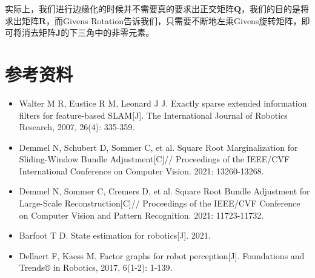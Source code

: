 \documentclass[a4pape,oneside,10pt]{article}
\begin{document}
实际上，我们进行边缘化的时候并不需要真的要求出正交矩阵$\mathbf{Q}$，我们的目的是将求出矩阵$\mathbf{R}$，而Givens Rotation告诉我们，只需要不断地左乘Givens旋转矩阵，即可将消去矩阵$\mathbf{J}$的下三角中的非零元素。

\section{参考资料}
\begin{itemize}
    \item Walter M R, Eustice R M, Leonard J J. Exactly sparse extended information filters for feature-based SLAM[J].
     The International Journal of Robotics Research, 2007, 26(4): 335-359.
    \item Demmel N, Schubert D, Sommer C, et al. Square Root Marginalization for Sliding-Window Bundle Adjustment[C]//
    Proceedings of the IEEE/CVF International Conference on Computer Vision. 2021: 13260-13268.
    \item Demmel N, Sommer C, Cremers D, et al. Square Root Bundle Adjustment for Large-Scale Reconstruction[C]//
    Proceedings of the IEEE/CVF Conference on Computer Vision and Pattern Recognition. 2021: 11723-11732.
    \item Barfoot T D. State estimation for robotics[J]. 2021. 
    \item Dellaert F, Kaess M. Factor graphs for robot perception[J]. Foundations and Trends® in Robotics, 2017, 6(1-2): 1-139.
    
\end{itemize}
\end{document}
